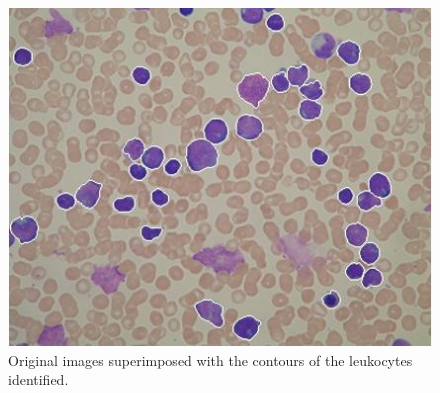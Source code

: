 {\begin{figure}[!htbp]
		\includegraphics[height=0.23\textheight]{images/Fig16-02}
		\caption[Leukocytes identification.]{\label{fig:example16}Original images superimposed with the contours of the leukocytes identified.}
	\end{figure}
	
}

